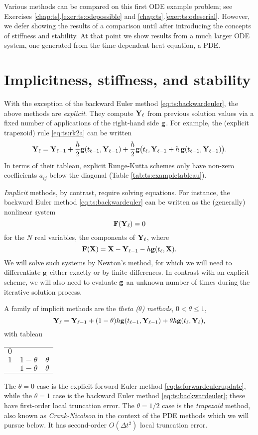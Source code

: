 Various \pTS methods can be compared on this first ODE example problem; see Exercises \ref{chap:ts}.\ref{exer:ts:odepossible} and \ref{chap:ts}.\ref{exer:ts:odeserial}.  However, we defer showing the results of a comparison until after introducing the concepts of stiffness and stability.  At that point we show results from a much larger ODE system, one generated from the time-dependent heat equation, a PDE.


\section{Implicitness, stiffness, and stability}

With the exception of the backward Euler method \eqref{eq:ts:backwardeuler}, the above methods are \emph{explicit}.  They compute $\mathbf{Y}_\ell$ from previous solution values via a fixed number of applications of the right-hand side $\mathbf{g}$.  For example, the \RKtwoa (explicit trapezoid) rule \eqref{eq:ts:rk2a} can be written
\begin{equation}
\mathbf{Y}_\ell = \mathbf{Y}_{\ell-1} + \frac{h}{2} \mathbf{g}(t_{\ell-1},\mathbf{Y}_{\ell-1}) + \frac{h}{2} \mathbf{g}\big(t_\ell,\mathbf{Y}_{\ell-1} + h\, \mathbf{g}(t_{\ell-1},\mathbf{Y}_{\ell-1})\big). \label{eq:ts:rk2aexplicit}
\end{equation}
In terms of their tableau, explicit Runge-Kutta schemes only have non-zero coefficients $a_{ij}$ below the diagonal (Table \ref{tab:ts:exampletableau}).

\emph{Implicit} methods, by contrast, require solving equations.  For instance, the backward Euler method \eqref{eq:ts:backwardeuler} can be written as the (generally) nonlinear system
    $$\mathbf{F}(\mathbf{Y}_\ell)=0$$
for the $N$ real variables, the components of $\mathbf{Y}_\ell$, where
    $$\mathbf{F}(\mathbf{X}) = \mathbf{X} - \mathbf{Y}_{\ell-1} - h \mathbf{g}(t_\ell,\mathbf{X}).$$
We will solve such systems by Newton's method, for which we will need to differentiate $\mathbf{g}$ either exactly or by finite-differences.  In contrast with an explicit scheme, we will also need to evaluate $\mathbf{g}$ an unknown number of times during the iterative solution process.

A family of implicit methods are the \emph{theta ($\theta$) methods}, $0<\theta\le 1$,
\begin{equation}
\mathbf{Y}_\ell = \mathbf{Y}_{\ell-1} + (1-\theta) h \mathbf{g}(t_{\ell-1},\mathbf{Y}_{\ell-1}) + \theta h \mathbf{g}(t_\ell,\mathbf{Y}_{\ell}),  \label{eq:ts:theta}
\end{equation}
with tableau
\begin{center}
\begin{tabular}{c|cc}
$0$   \\
$1$ & $1-\theta$ & $\theta$ \\ \hline
    & $1-\theta$ & $\theta$
\end{tabular}
\end{center}
The $\theta=0$ case is the explicit forward Euler method \eqref{eq:ts:forwardeulerupdate}, while the $\theta=1$ case is the backward Euler method \eqref{eq:ts:backwardeuler}; these have first-order local truncation error.  The $\theta=1/2$ case is the \emph{trapezoid} method, also known as \emph{Crank-Nicolson} \citep{MortonMayers2005} in the context of the PDE methods which we will pursue below.  It has second-order $O(\Delta t^2)$ local truncation error.

